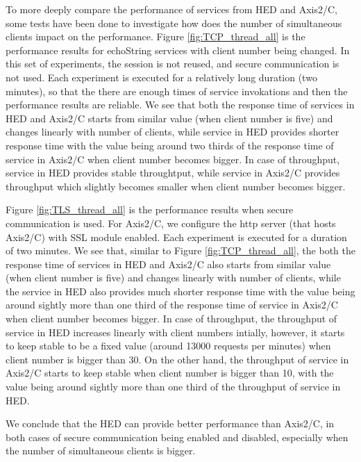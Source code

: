 \documentclass[conference]{IEEEtran}
\begin{document}
To more deeply compare the performance of services from HED and Axis2/C, some tests have
been done to investigate how does the number of simultaneous clients impact on the performance.
Figure \ref{fig:TCP_thread_all} is the performance results for echoString services with client number
being changed. In this set of experiments, the session is not reused, and secure communication is not
used. Each experiment is executed for a relatively long duration (two minutes), so that the there are
enough times of service invokations and then the performance results are reliable.
We see that both the response time of services in HED and Axis2/C starts from similar value 
(when client number is five) and changes linearly with number of clients, while service in HED 
provides shorter response time with the value being around two thirds of the response time of 
service in Axis2/C when client number becomes bigger.
In case of throughput, service in HED provides stable throughtput, while service in Axis2/C provides 
throughput which slightly becomes smaller when client number becomes bigger.

Figure \ref{fig:TLS_thread_all} is the performance results when secure communication is used.
For Axis2/C, we configure the http server (that hosts Axis2/C) with SSL module enabled.
Each experiment is executed for a duration of two minutes.
We see that, similar to Figure \ref{fig:TCP_thread_all}, the both the response time of services 
in HED and Axis2/C also starts from similar value (when client number is five) and changes linearly 
with number of clients, while the service in HED also provides much shorter response time 
with the value being around sightly more than one third of the response time of service in Axis2/C 
when client number becomes bigger.
In case of throughput, the throughput of service in HED increases linearly with client numbers intially,
however, it starts to keep stable to be a fixed value (around 13000 requests per minutes) when client 
number is bigger than 30. On the other hand, the throughput of service in Axis2/C starts to keep 
stable when client number is bigger than 10, with the value being around sightly more than one 
third of the throughput of service in HED.

We conclude that the HED can provide better performance than Axis2/C, in both cases of secure 
communication being enabled and disabled, especially when the number of simultaneous clients 
is bigger.
\end{document}
